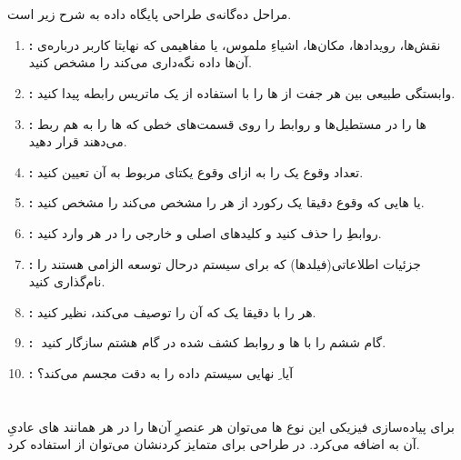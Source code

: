 \documentclass{article}
\begin{document}


\newpage


\section{}%
مراحل ده‌گانه‌ی طراحی پایگاه داده به شرح زیر است.
\begin{enumerate}
    \item \textbf{:}
نقش‌ها، رویدادها، مکان‌ها، اشیاءِ ملموس، یا مفاهیمی که نهایتا کاربر درباره‌ی آن‌ها داده نگه‌داری می‌کند را مشخص کنید.
    \item \textbf{:}
وابستگی طبیعی بین هر جفت از ها را با استفاده از یک ماتریس رابطه پیدا کنید.
	\item \textbf{:}
ها را در مستطیل‌ها و روابط را روی قسمت‌های خطی که ها را به هم ربط می‌دهند قرار دهید.
	\item \textbf{:}
تعداد وقوع یک  را به ازای وقوع یکتای  مربوط به آن تعیین کنید.
	\item \textbf{:}
 یا هایی که وقوع دقیقا یک رکورد از هر  را مشخص می‌کند را مشخص کنید.
	\item \textbf{:}
روابطِ  را حذف کنید و کلید‌های اصلی و خارجی را در هر  وارد کنید.
	\item \textbf{:}
جزئیات اطلاعاتی(فیلدها) که برای سیستم درحال توسعه الزامی هستند را نام‌گذاری کنید.
	\item \textbf{:}
هر  را با دقیقا یک  که آن را توصیف می‌کند، نظیر کنید.
	\item \textbf{:}
ِ گام ششم را با ها و روابط کشف شده در گام هشتم سازگار کنید.
	\item \textbf{:}
آیا ِ نهایی سیستم داده را به دقت مجسم می‌کند؟
\end{enumerate}

\section{}%
\subsection{}
برای پیاده‌سازی فیزیکی این نوع ها می‌توان هر عنصرِ آن‌ها را در هر  همانند های عادیِ آن  به  اضافه می‌کرد. در طراحی برای متمایز کردنشان می‌توان از  استفاده کرد.
\end{document}
